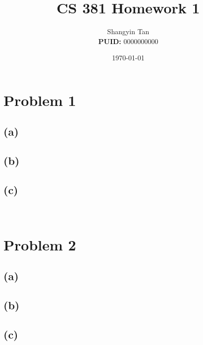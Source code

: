 \documentclass[hidelinks]{article}
\newcommand{\HWNUM}{1} %
\newcommand{\CLASS}{\bf CS 381} %
\newcommand{\NAME}{Shangyin Tan %
\\\textbf{PUID:} 0000000000} %
\newcommand{\DOCTYPE}{Homework} %
\begin{document}
\title{\CLASS{} \DOCTYPE{} \HWNUM{}\vspace*{-0.1in}}
\author{\NAME\vspace*{-0.04in}}
\date{\today}
\maketitle
\thispagestyle{fancy}

\section*{Problem 1}
\subsection*{(a)}
\subsection*{(b)}
\subsection*{(c)}
\textbf{}\\
\section*{Problem 2}
\subsection*{(a)}
\subsection*{(b)}
\subsection*{(c)}
\end{document}
